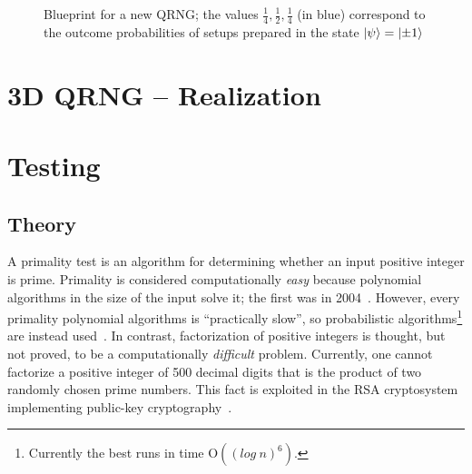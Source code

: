 \documentclass[11pt,a4paper]{article}
\begin{document}
\begin{figure}
\caption{Blueprint for a new QRNG; the values $\frac{1}{4}, \frac{1}{2},\frac{1}{4}$ (in blue)  correspond to the outcome probabilities of setups prepared in the  state $\ket{\psi} = \ket{\pm 1}$}
\label{fig2}
\end{figure}



\section{3D QRNG -- Realization}
\section{Testing}
\subsection{Theory}
A primality test is an algorithm for determining whether an input positive integer is prime.
 Primality is considered computationally {\it easy} because polynomial algorithms in the size of the input solve it;  the first was in 2004~\cite{primeP}. However, every primality polynomial algorithms is ``practically slow'', so probabilistic algorithms\footnote{Currently the best runs in time O$((log \ n)^6)$.} are instead used~\cite{Stiglic2011}.
   In contrast, factorization of positive integers is thought, but not proved,  to be a computationally {\it difficult} problem. Currently, one cannot factorize a positive integer of 500 decimal digits that is the product of two randomly chosen prime numbers. This fact  is exploited in the RSA cryptosystem implementing public-key cryptography~\cite{Riesel2012}.
\end{document}
